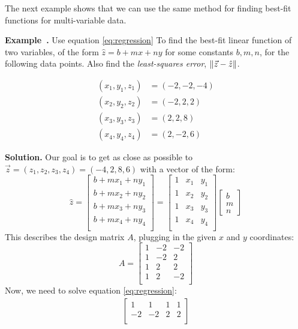 \documentclass[11pt, letterpaper]{report}
\newenvironment{book}{}{}
\let\originalleft\left
\let\originalright\right
\renewcommand{\left}{\mathopen{}\mathclose\bgroup\originalleft}
\renewcommand{\right}{\aftergroup\egroup\originalright}
\newcounter{example}[section]
\newcommand{\example}{\refstepcounter{example}%
\par\noindent\textbf{Example~\theexample.} }
\newcommand{\bbtwocol}[4]{%
  \begin{minipage}[t]{#1\linewidth} \vspace{0em} #3 \end{minipage}
  \hfill
  \begin{minipage}[t]{#2\linewidth} \vspace{0em} #4 \end{minipage}
}
\newcommand\nm[1]{\left\lVert #1 \right\rVert}
\begin{document}
The next example shows that we can use the same method for finding best-fit functions for multi-variable data.

\bbtwocol{.7}{.25}{
\example \label{example:best-fit-plane} Use equation \ref{eq:regression} To find the best-fit linear function of two variables, of the form $\hat{z} =b + mx + ny$ for some constants $b,m,n$, for the following data points. Also find the \emph{least-squares error}, $\nm{\vec{z}-\hat{z}}$.
}{
\begin{align*}
(x_1,y_1,z_1) &= (-2,-2,-4) \\
(x_2,y_2,z_2) &= (-2,2,2) \\
(x_3,y_3,z_3) &= (2,2,8) \\
(x_4,y_4,z_4) &= (2,-2,6)
\end{align*}
}

\begin{book}
\textbf{Solution.} Our goal is to get as close as possible to $\vec{z}=(z_1,z_2,z_3,z_4) = (-4,2,8,6)$ with a vector of the form:
\[\hat{z}= \begin{bmatrix}
b + mx_1 + ny_1 \\
b + mx_2 + ny_2 \\
b + mx_3 + ny_3 \\
b + mx_4 + ny_4 \\
\end{bmatrix} = \begin{bmatrix}
1 & x_1 & y_1 \\
1 & x_2 & y_2 \\
1 & x_3 & y_3 \\
1 & x_4 & y_4 \\
\end{bmatrix}\begin{bmatrix}
b \\ m \\ n
\end{bmatrix}\]
This describes the design matrix $A$, plugging in the given $x$ and $y$ coordinates:
\[A=\begin{bmatrix}
1 & -2 & -2 \\
1 & -2 & 2 \\
1 & 2 & 2 \\
1 & 2 & -2 \\
\end{bmatrix}\]
Now, we need to solve equation \ref{eq:regression}:
\begin{align*}
\begin{bmatrix}
1 & 1 & 1 & 1 \\
-2 & -2 & 2 & 2 \\

\end{bmatrix}
\end{align*}
\end{book}
\end{document}
